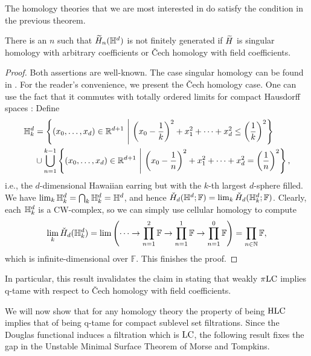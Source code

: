 The homology theories that we are most interested in do satisfy the condition in the previous theorem.

\begin{prop}
	There is an $n$ such that $\widetilde{H}_{n}(\mathbb{H}^d)$ is not finitely generated if $\widetilde{H}$ is singular homology with arbitrary coefficients or \v{C}ech homology with field coefficients.
\end{prop}

\begin{proof}
	Both assertions are well-known. The case singular homology can be found in \cite{Barratt.1962}. For the reader's convenience, we present the \v{C}ech homology case.
	One can use the fact that it commutes with totally ordered limits for compact Hausdorff spaces \cite[Theorems VIII.3.6.\@ and X.3.1.]{MR0050886}:
	Define 
	\begin{align*}
	\HE_k &= \left\{ (x_0, \dots, x_d) \in \R^{d+1} \ \middle|\  \left( x_0 - \frac{1}{k} \right)^2 + x_1^2 + \dots + x_d^2 \leq \left( \frac{1}{k} \right)^2 \right\} \\
	& \cup \bigcup_{n=1}^{k-1} \left\{ (x_0, \dots, x_d) \in \R^{d+1} \ \middle|\  \left( x_0 - \frac{1}{n} \right)^2 + x_1^2 + \dots + x_d^2 = \left( \frac{1}{n} \right)^2 \right \},
	\end{align*}
	i.e., the $d$-dimensional Hawaiian earring but with the $k$-th largest $d$-sphere filled.
	We have $\lim_{k} \mathbb{H}^d_{k} = \bigcap_{k} \mathbb{H}^d_{k} = \mathbb{H}^d$, and hence $\check{H}_{d}(\mathbb{H}^d; \mathbb{F}) = \lim_{k} \check{H}_{d}(\mathbb{H}^d_{k}; \mathbb{F})$.
	Clearly, each $\mathbb{H}^d_{k}$ is a CW-complex, so we can simply use cellular homology to compute
	\begin{equation*}
	\lim_{k}\check{H}_{d}(\mathbb{H}^{d}_{k})=\lim\left(\dots\to \prod_{n=1}^2\mathbb{F}\to \prod_{n=1}^1\mathbb{F}\to \prod_{n=1}^0\mathbb{F}\right)=\prod_{n\in\mathbb{N}}\mathbb{F},
	\end{equation*}
	which is infinite-dimensional over $\mathbb{F}$.
	This finishes the proof.
\end{proof}

In particular, this result invalidates the claim in \cite[Theorem 6.3]{Morse.1940} stating that weakly $\pi\mathrm{LC}$ implies q-tame with respect to \v{C}ech homology with field coefficients.

We will now show that for any homology theory the property of being $\mathrm{HLC}$ implies that of being q-tame for compact sublevel set filtrations.
Since the Douglas functional induces a filtration which is $\mathrm{LC}$, the following result fixes the gap in the Unstable Minimal Surface Theorem of Morse and Tompkins.

